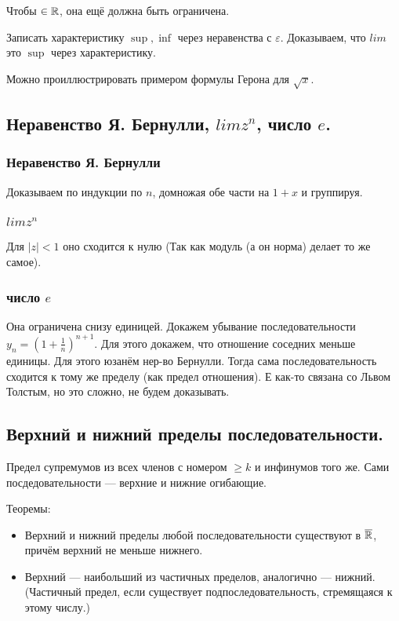 \documentclass[12pt, a4paper]{article}
\begin{document}
Чтобы $\in {\mathbb{R}}$, она ещё должна быть ограничена.

Записать характеристику $\sup, \inf$ через неравенства с $\varepsilon$.
Доказываем, что $lim$ это $\sup$ через характеристику.

Можно проиллюстрировать примером формулы Герона для $\sqrt{x}$.

\subsection{Неравенство Я. Бернулли, $lim z^n$, число $e$.}

\subsubsection{Неравенство Я. Бернулли}
    Доказываем по индукции по $n$, домножая обе части на $1 + x$ и группируя.

\subsubsection{$lim z^n$}
    Для $|z| < 1$ оно сходится к нулю (Так как модуль (а он норма) делает то же самое).

\subsubsection{число $e$}
    Она ограничена снизу единицей. Докажем убывание последовательности $y_n = (1 + \frac{1}{n})^{n + 1}$. 
    Для этого докажем, что отношение соседних меньше единицы.
    Для этого юзанём нер-во Бернулли.
    Тогда сама последовательность сходится к тому же пределу (как предел отношения).
    Е как-то связана со Львом Толстым, но это сложно, не будем доказывать.

\subsection{Верхний и нижний пределы последовательности.}

Предел супремумов из всех членов с номером $\geqslant k$ и инфинумов того же.
Сами посдедовательности — верхние и нижние огибающие.

Теоремы:
\begin{itemize}
    \item Верхний и нижний пределы любой последовательности существуют в $\overline{{\mathbb{R}}}$, причём верхний не меньше нижнего.
    \item Верхний — наибольший из частичных пределов, аналогично — нижний. (Частичный предел, если существует подпоследовательность, стремящаяся к этому числу.)
\end{itemize}
\end{document}
